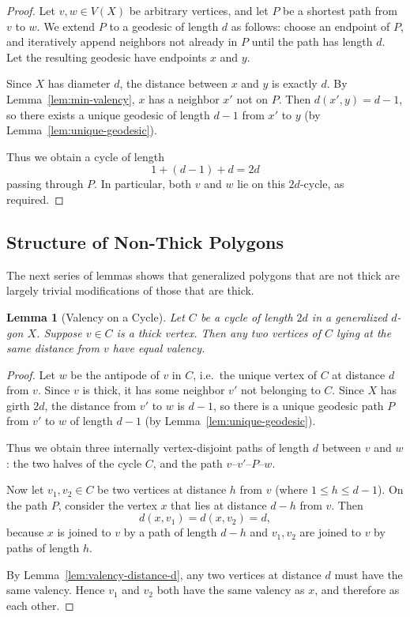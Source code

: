 \documentclass[12pt,a4paper,openany]{book}
\newtheorem{lemma}{Lemma}[section]
\begin{document}
\begin{proof}
Let $v,w \in V(X)$ be arbitrary vertices, and let $P$ be a shortest path from $v$ to $w$.  
We extend $P$ to a geodesic of length $d$ as follows:  
choose an endpoint of $P$, and iteratively append neighbors not already in $P$ until the path has length $d$.  
Let the resulting geodesic have endpoints $x$ and $y$.  

Since $X$ has diameter $d$, the distance between $x$ and $y$ is exactly $d$.  
By Lemma~\ref{lem:min-valency}, $x$ has a neighbor $x'$ not on $P$.  
Then $d(x',y) = d-1$, so there exists a unique geodesic of length $d-1$ from $x'$ to $y$ (by Lemma~\ref{lem:unique-geodesic}).  

Thus we obtain a cycle of length
\[
1 + (d-1) + d = 2d
\]
passing through $P$.  
In particular, both $v$ and $w$ lie on this $2d$-cycle, as required.
\end{proof}

\subsection{Structure of Non-Thick Polygons}

The next series of lemmas shows that generalized polygons that are not thick are largely trivial modifications of those that are thick.

\begin{lemma}[Valency on a Cycle]\label{lem:valency-cycle}
Let $C$ be a cycle of length $2d$ in a generalized $d$-gon $X$. 
Suppose $v \in C$ is a thick vertex. 
Then any two vertices of $C$ lying at the same distance from $v$ have equal valency.
\end{lemma}

\begin{proof}
Let $w$ be the antipode of $v$ in $C$, i.e.\ the unique vertex of $C$ at distance $d$ from $v$.  
Since $v$ is thick, it has some neighbor $v'$ not belonging to $C$.  
Since $X$ has girth $2d$, the distance from $v'$ to $w$ is $d-1$, so there is a unique geodesic path $P$ from $v'$ to $w$ of length $d-1$ (by Lemma~\ref{lem:unique-geodesic}).  

Thus we obtain three internally vertex-disjoint paths of length $d$ between $v$ and $w$:  
the two halves of the cycle $C$, and the path $v$--$v'$--$P$--$w$.  

Now let $v_1,v_2\in C$ be two vertices at distance $h$ from $v$ (where $1 \leq h \leq d-1$).  
On the path $P$, consider the vertex $x$ that lies at distance $d-h$ from $v$.  
Then
\[
d(x,v_1) = d(x,v_2) = d,
\]
because $x$ is joined to $v$ by a path of length $d-h$ and $v_1,v_2$ are joined to $v$ by paths of length $h$.  

By Lemma~\ref{lem:valency-distance-d}, any two vertices at distance $d$ must have the same valency.  
Hence $v_1$ and $v_2$ both have the same valency as $x$, and therefore as each other.  
\end{proof}
\end{document}
